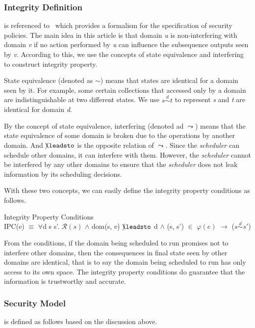 \documentclass[runningheads]{llncs}
\makeatletter
\newcommand{\equidom}[3]{{#1}\stackrel{#2}{\sim}{#3}}
\newcommand{\superimpose}[2]
	{{\ooalign{$#1\@firstoftwo#2$\cr\hfil$#1\@secondoftwo#2$\hfil\cr}}}
\newcommand{\interf}{\leadsto}
\newcommand{\ninterf}{\mathrel{\mathpalette\superimpose{{\slash}{\leadsto}}}}
\makeatother
\begin{document}
\subsubsection{Integrity Definition} is referenced to~\cite{reg_noninterference} which provides a formalism for the specification of security policies. The main idea in this article is that domain \emph{u} is non-interfering with domain \emph{v} if no action performed by \emph{u} can influence the subsequence outputs seen by \emph{v}. According to this, we use the concepts of state equivalence and interfering to construct integrity property.

State equivalence (denoted as $\sim$) means that states are identical for a domain seen by it. For example, some certain collections that accessed only by a domain are indistinguishable at two different states. We use $\equidom{s}{d}{t}$ to represent \emph{s} and \emph{t} are identical for domain \emph{d}.

By the concept of state equivalence, interfering (denoted ad $\interf$) means that the state equivalence of some domain is broken due to the operations by another domain. And $\ninterf$ is the opposite relation of $\interf$. Since the \emph{scheduler} can schedule other domains, it can interfere with them. However, the \emph{scheduler} cannot be interfered by any other domains to ensure that the \emph{scheduler} does not leak information by its scheduling decisions.

With these two concepts, we can easily define the integrity property conditions as follows.

\begin{definition} {Integrity Property Conditions} \\
IPC(e) $\equiv$ $\forall$d s s'. $\mathcal{R}(s)$ $\wedge$ dom(s, e) $\ninterf$ d $\wedge$ (s, s') $\in$ $\varphi(e)$ $\longrightarrow$ ($\equidom{s}{d}{s'}$)
\end{definition}

From the conditions, if the domain being scheduled to run promises not to interfere other domains, then the consequences in final state seen by other domains are identical, that is to say the domain being scheduled to run has only access to its own space. The integrity property conditions do guarantee that the information is trustworthy and accurate.

\subsubsection{Security Model} is defined as follows based on the discussion above.
\end{document}
